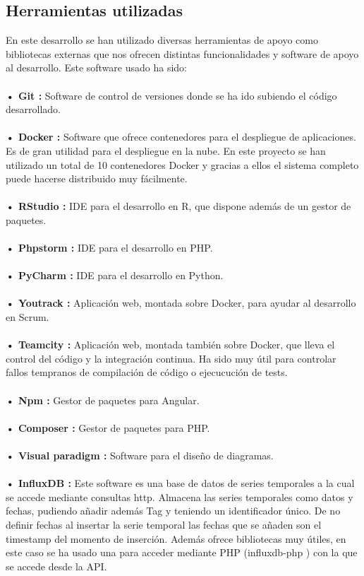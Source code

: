 \documentclass[14pt]{extarticle}
\theoremstyle{definition}
\theoremstyle{remark}
\begin{document}
\subsection{Herramientas utilizadas}
En este desarrollo se han utilizado diversas herramientas de apoyo como bibliotecas externas que nos ofrecen distintas funcionalidades y software de apoyo al desarrollo. Este software usado ha sido:\\\\
\textbf{• Git \citep{wiki:git}:} Software de control de versiones donde se ha ido subiendo el código desarrollado.\\\\
\textbf{• Docker \citep{wiki:docker}:} Software que ofrece contenedores para el despliegue de aplicaciones. Es de gran utilidad para el despliegue en la nube. En este proyecto se han utilizado un total de 10 contenedores Docker y gracias a ellos el sistema completo puede hacerse distribuido muy fácilmente.\\\\
\textbf{• RStudio \citep{wiki:rstudio}:} IDE para el desarrollo en R, que dispone además de un gestor de paquetes.\\\\
\textbf{• Phpstorm \citep{web:phpstorm}:} IDE para el desarrollo en PHP.\\\\
\textbf{• PyCharm \citep{web:pycharm}:} IDE para el desarrollo en Python.\\\\
\textbf{• Youtrack \citep{web:youtrack}:} Aplicación web, montada sobre Docker, para ayudar al desarrollo en Scrum.\\\\
\textbf{• Teamcity \citep{web:teamcity}:} Aplicación web, montada también sobre Docker, que lleva el control del código y la integración continua. Ha sido muy útil para controlar fallos tempranos de compilación de código o ejecucución de tests.\\\\ 
\textbf{• Npm \citep{wiki:npm}:} Gestor de paquetes para Angular.\\\\
\textbf{• Composer \citep{web:composer}:} Gestor de paquetes para PHP.\\\\
\textbf{• Visual paradigm \citep{web:visualparadigm}:} Software para el diseño de diagramas.\\\\
\textbf{• InfluxDB \citep{web:influxdb}:} Este software es una base de datos de series temporales a la cual se accede mediante consultas http. Almacena las series temporales como datos y fechas, pudiendo añadir además Tag y teniendo un identificador único. De no definir fechas al insertar la serie temporal las fechas que se añaden son el timestamp del momento de inserción. Además ofrece bibliotecas muy útiles, en este caso se ha usado una para acceder mediante PHP (influxdb-php \citep{github:influxdb}) con la que se accede desde la API.\\\\
\end{document}
